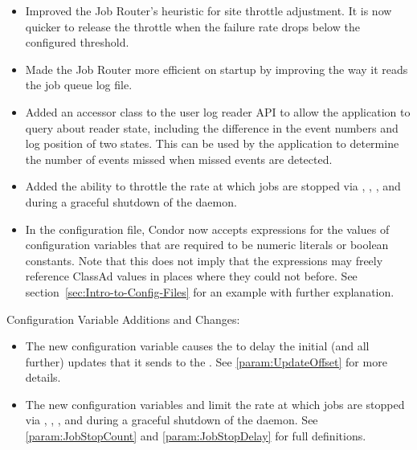 \begin{itemize}
\item Improved the Job Router's heuristic for site throttle adjustment.  It
is now quicker to release the throttle when the failure rate drops
below the configured threshold.

\item Made the Job Router more efficient on startup by improving the way it
reads the job queue log file.

\item Added an accessor class to the user log reader API to allow the
  application to query about reader state, including the
  difference in the event numbers and log position of two states.  This
  can be used by the application to determine the number of events
  missed when missed events are detected.

\item Added the ability to throttle the rate at which jobs are
stopped via , , ,
and during a graceful shutdown of the  daemon.

\item In the configuration file, Condor now accepts expressions for
the values of configuration variables that are required to be 
numeric literals or boolean constants.  
Note that this does not imply that the
expressions may freely reference ClassAd values in places where they
could not before.  
See section~\ref{sec:Intro-to-Config-Files} for an example with
further explanation.

\end{itemize}

\noindent Configuration Variable Additions and Changes:

\begin{itemize}

\item The new configuration variable  
  causes the  to
  delay the initial (and all further) updates that it sends to the
  .  See \ref{param:UpdateOffset} for more details.

\item The new configuration variables
   and 
  limit the rate at which jobs are stopped via ,
  , , and during a graceful shutdown of
  the  daemon.
  See \ref{param:JobStopCount} and \ref{param:JobStopDelay} 
  for full definitions.

\end{itemize}

